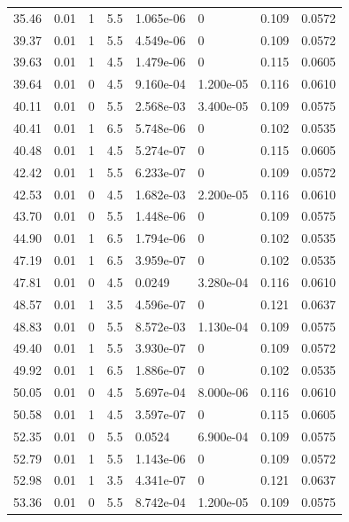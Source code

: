 \documentclass[preview]{standalone}
\begin{document}
{{{\begin{tabular}{L{1.2cm}C{1.2cm} C{0.3cm}C{0.5cm} C{1.4cm}C{1.4cm} C{1.4cm}C{1.4cm}}
  35.46  &  0.01  & 1     & 5.5 &  1.065e-06  & 0  & 0.109 &  0.0572   \\ 
  39.37  &  0.01  & 1     & 5.5 &  4.549e-06  & 0  & 0.109 &  0.0572   \\ 
  39.63  &  0.01  & 1     & 4.5 &  1.479e-06  & 0  & 0.115 &  0.0605   \\ 
  39.64  &  0.01  & 0     & 4.5 &  9.160e-04  & 1.200e-05  & 0.116 &  0.0610   \\ 
  40.11  &  0.01  & 0     & 5.5 &  2.568e-03  & 3.400e-05  & 0.109 &  0.0575   \\ 
  40.41  &  0.01  & 1     & 6.5 &  5.748e-06  & 0  & 0.102 &  0.0535   \\ 
  40.48  &  0.01  & 1     & 4.5 &  5.274e-07  & 0  & 0.115 &  0.0605   \\ 
  42.42  &  0.01  & 1     & 5.5 &  6.233e-07  & 0  & 0.109 &  0.0572   \\ 
  42.53  &  0.01  & 0     & 4.5 &  1.682e-03  & 2.200e-05  & 0.116 &  0.0610   \\ 
  43.70  &  0.01  & 0     & 5.5 &  1.448e-06  & 0  & 0.109 &  0.0575   \\ 
  44.90  &  0.01  & 1     & 6.5 &  1.794e-06  & 0  & 0.102 &  0.0535   \\ 
  47.19  &  0.01  & 1     & 6.5 &  3.959e-07  & 0  & 0.102 &  0.0535   \\ 
  47.81  &  0.01  & 0     & 4.5 &  0.0249  & 3.280e-04  & 0.116 &  0.0610   \\ 
  48.57  &  0.01  & 1     & 3.5 &  4.596e-07  & 0  & 0.121 &  0.0637   \\ 
  48.83  &  0.01  & 0     & 5.5 &  8.572e-03  & 1.130e-04  & 0.109 &  0.0575   \\ 
  49.40  &  0.01  & 1     & 5.5 &  3.930e-07  & 0  & 0.109 &  0.0572   \\ 
  49.92  &  0.01  & 1     & 6.5 &  1.886e-07  & 0  & 0.102 &  0.0535   \\ 
  50.05  &  0.01  & 0     & 4.5 &  5.697e-04  & 8.000e-06  & 0.116 &  0.0610   \\ 
  50.58  &  0.01  & 1     & 4.5 &  3.597e-07  & 0  & 0.115 &  0.0605   \\ 
  52.35  &  0.01  & 0     & 5.5 &  0.0524  & 6.900e-04  & 0.109 &  0.0575   \\ 
  52.79  &  0.01  & 1     & 5.5 &  1.143e-06  & 0  & 0.109 &  0.0572   \\ 
  52.98  &  0.01  & 1     & 3.5 &  4.341e-07  & 0  & 0.121 &  0.0637   \\ 
  53.36  &  0.01  & 0     & 5.5 &  8.742e-04  & 1.200e-05  & 0.109 &  0.0575   \\ 

\end{tabular}}}}
\end{document}
